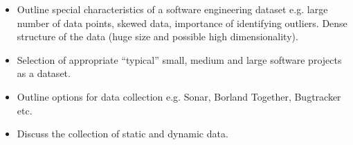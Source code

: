 
\begin{itemize}
	\item Outline special characteristics of a software engineering dataset e.g. large number of data points, skewed data, importance of identifying outliers. Dense structure of the data (huge size and possible high dimensionality).
	\item Selection of appropriate “typical” small, medium and large software projects as a dataset.
	\item Outline options for data collection e.g. Sonar, Borland Together, Bugtracker etc.
	\item Discuss the collection of static and dynamic data.
\end{itemize}


